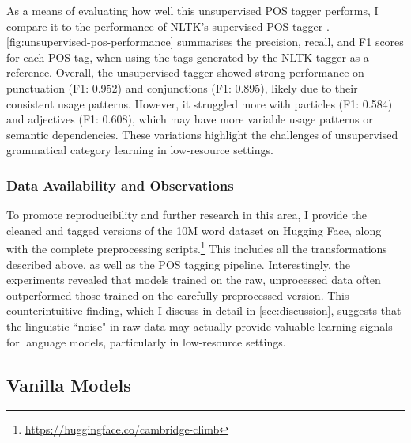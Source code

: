 As a means of evaluating how well this unsupervised POS tagger performs, I compare it to the performance of NLTK's supervised POS tagger \citep{bird2009natural}. \cref{fig:unsupervised-pos-performance} summarises the precision, recall, and F1 scores for each POS tag, when using the tags generated by the NLTK tagger as a reference. Overall, the unsupervised tagger showed strong performance on punctuation (F1: 0.952) and conjunctions (F1: 0.895), likely due to their consistent usage patterns. However, it struggled more with particles (F1: 0.584) and adjectives (F1: 0.608), which may have more variable usage patterns or semantic dependencies. These variations highlight the challenges of unsupervised grammatical category learning in low-resource settings.

\subsubsection{Data Availability and Observations}
To promote reproducibility and further research in this area, I provide the cleaned and tagged versions of the 10M word dataset on Hugging Face, along with the complete preprocessing scripts.\footnote{\url{https://huggingface.co/cambridge-climb}} This includes all the transformations described above, as well as the POS tagging pipeline. Interestingly, the experiments revealed that models trained on the raw, unprocessed data often outperformed those trained on the carefully preprocessed version. This counterintuitive finding, which I discuss in detail in \cref{sec:discussion}, suggests that the linguistic ``noise" in raw data may actually provide valuable learning signals for language models, particularly in low-resource settings.

\subsection{Vanilla Models}
\label{subsec:baseline}

